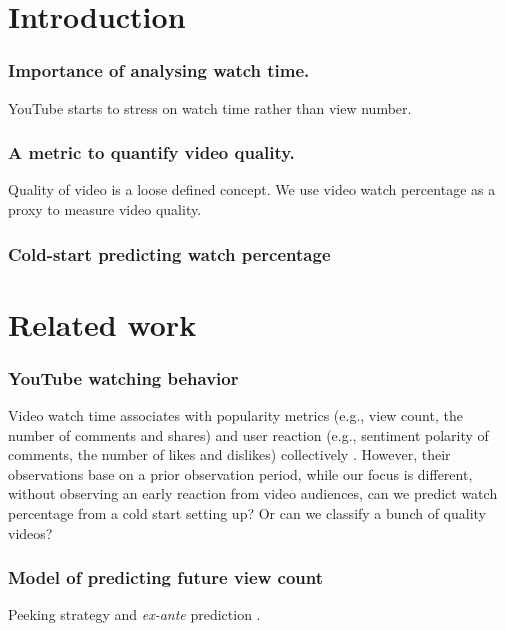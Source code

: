 \section{Introduction}

\subsubsection{Importance of analysing watch time.} YouTube starts to stress on watch time rather than view number.

\subsubsection{A metric to quantify video quality.} Quality of video is a loose defined concept. We use video watch percentage as a proxy to measure video quality.

\subsubsection{Cold-start predicting watch percentage}


\section{Related work}

\subsubsection{YouTube watching behavior} Video watch time associates with popularity metrics (e.g., view count, the number of comments and shares) and user reaction (e.g., sentiment polarity of comments, the number of likes and dislikes) collectively \cite{park:2016engagement}. However, their observations base on a prior observation period, while our focus is different, without observing an early reaction from video audiences, can we predict watch percentage from a cold start setting up? Or can we classify a bunch of quality videos?

\subsubsection{Model of predicting future view count} Peeking strategy and \textit{ex-ante} prediction \cite{martin:2016exploring}.



